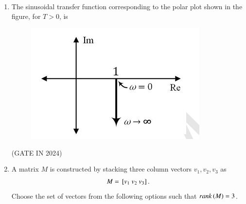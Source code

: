 \documentclass[journal,12pt,onecolumn]{IEEEtran}
\theoremstyle{remark}
\begin{document}
\begin{enumerate}
    \item The sinusoidal transfer function corresponding to the polar plot shown in the figure,  for $T > 0$, is
    \begin{figure}[H]
        \centering
        \includegraphics[width=0.5\columnwidth]{figs/p9.jpg}
        \caption*{}
        \label{fig:p9}
    \end{figure}

    \hfill{(GATE IN 2024)}
    \begin{enumerate}
    \end{enumerate}
    
    \item A matrix $M$ is constructed by stacking three column vectors $v_1, v_2, v_3$ as
    \begin{align*}
        M = {}\left[v_1 \ v_2 \ v_3\right].
    \end{align*}
    Choose the set of vectors from the following options such that $rank\left(M\right) = 3$.
    

\end{enumerate}
\end{document}
